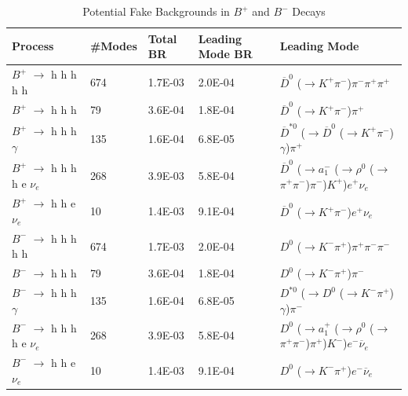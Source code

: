 \begin{table}[!ht]
    \small
    \begin{tabular}{|| l | l | l | l | l ||}
        \hline
        {\textbf {Process}} & {\textbf {\#Modes}} & {\textbf {Total BR}} & {\textbf {Leading Mode BR}} & {\textbf {Leading Mode}}\\
        \hline
        $B^+$ $\to$ h h h h h & 674 & 1.7E-03 & 2.0E-04 & $\overline{D}^0$ ($\rightarrow$$K^+$$\pi^-$)$\pi^-$$\pi^+$$\pi^+$  \\
        $B^+$ $\to$ h h h & 79 & 3.6E-04 & 1.8E-04 & $\overline{D}^0$ ($\rightarrow$$K^+$$\pi^-$)$\pi^+$  \\
        $B^+$ $\to$ h h h $\gamma$ & 135 & 1.6E-04 & 6.8E-05 & $\overline{D}^{*0}$ ($\rightarrow$$\overline{D}^0$ ($\rightarrow$$K^+$$\pi^-$)$\gamma$)$\pi^+$  \\
        $B^+$ $\to$ h h h h e $\nu_e$ & 268 & 3.9E-03 & 5.8E-04 & $\overline{D}^0$ ($\rightarrow$$a_1^-$ ($\rightarrow$$\rho^0$ ($\rightarrow$$\pi^+$$\pi^-$)$\pi^-$)$K^+$)$e^+$$\nu_e$  \\
        $B^+$ $\to$ h h e $\nu_e$ & 10 & 1.4E-03 & 9.1E-04 & $\overline{D}^0$ ($\rightarrow$$K^+$$\pi^-$)$e^+$$\nu_e$  \\
        $B^-$ $\to$ h h h h h & 674 & 1.7E-03 & 2.0E-04 & $D^0$ ($\rightarrow$$K^-$$\pi^+$)$\pi^+$$\pi^-$$\pi^-$  \\
        $B^-$ $\to$ h h h & 79 & 3.6E-04 & 1.8E-04 & $D^0$ ($\rightarrow$$K^-$$\pi^+$)$\pi^-$  \\
        $B^-$ $\to$ h h h $\gamma$ & 135 & 1.6E-04 & 6.8E-05 & $D^{*0}$ ($\rightarrow$$D^0$ ($\rightarrow$$K^-$$\pi^+$)$\gamma$)$\pi^-$  \\
        $B^-$ $\to$ h h h h e $\nu_e$ & 268 & 3.9E-03 & 5.8E-04 & $D^0$ ($\rightarrow$$a_1^+$ ($\rightarrow$$\rho^0$ ($\rightarrow$$\pi^+$$\pi^-$)$\pi^+$)$K^-$)$e^-$$\overline{\nu}_e$  \\
        $B^-$ $\to$ h h e $\nu_e$ & 10 & 1.4E-03 & 9.1E-04 & $D^0$ ($\rightarrow$$K^-$$\pi^+$)$e^-$$\overline{\nu}_e$   \\
        \hline
    \end{tabular} 
    \caption{Potential Fake Backgrounds in $B^+$ and $B^-$ Decays}
    \label{tab:potential-fake-backgrounds-bp}
\end{table}
